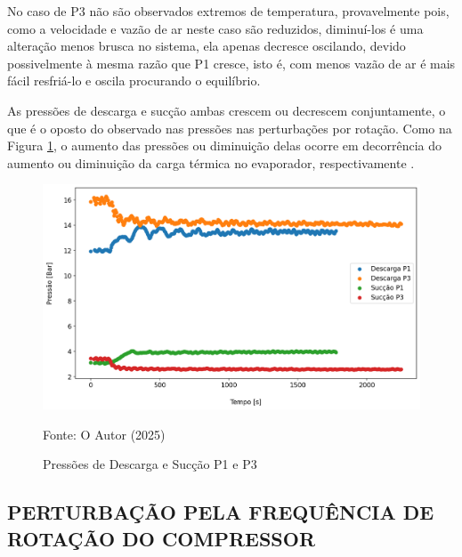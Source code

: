 No caso de P3 não são observados extremos de temperatura, provavelmente pois, como a velocidade e vazão de ar neste caso são reduzidos, diminuí-los é uma alteração menos brusca no sistema, ela apenas decresce oscilando, devido possivelmente à mesma razão que P1 cresce, isto é, com menos vazão de ar é mais fácil resfriá-lo e oscila procurando o equilíbrio.

As pressões de descarga e sucção ambas crescem ou decrescem conjuntamente, o que é o oposto do observado nas pressões nas perturbações por rotação. Como na Figura \ref{fig:Pressões de Sucção e Descarga P1 e P3}, o aumento das pressões ou diminuição delas ocorre em decorrência do aumento ou diminuição da carga térmica no evaporador, respectivamente \cite{EffectsOFRefrigeranteCompressorAirFlow}.

\begin{figure}[h]
    \centering
    \includegraphics[width=1\linewidth]{FigurasdoTexto/Pressões de Sucção e Descarga P1 e P3.png}
    \caption{Pressões de Descarga e Sucção P1 e P3}
    \label{fig:Pressões de Sucção e Descarga P1 e P3}
    {\footnotesize Fonte: O Autor (2025)}
\end{figure}

\subsection{\MakeUppercase{Perturbação pela Frequência de Rotação do Compressor}}\label{subsec:PertubaçãoRotacaoCompressor}


